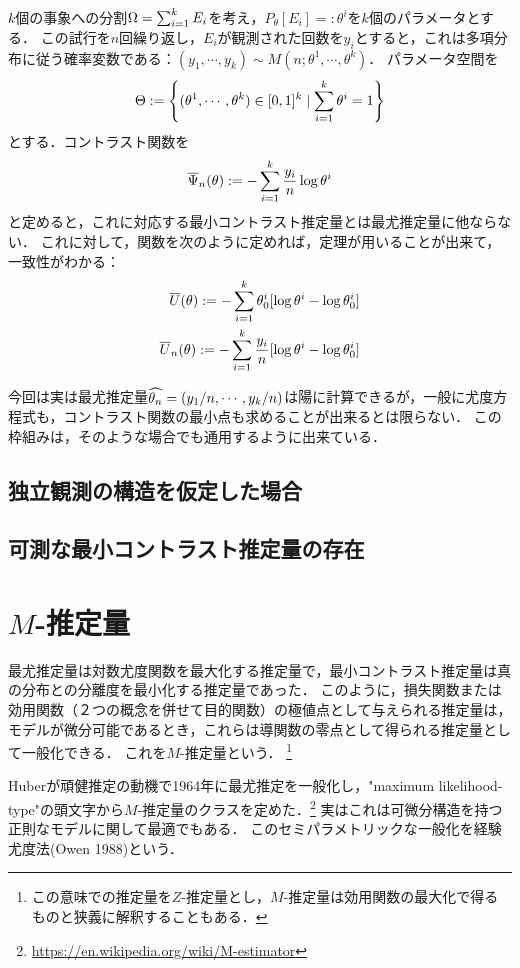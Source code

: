\documentclass[uplatex,dvipdfmx]{jsreport}
\begin{document}
\begin{example}[多項分布]\label{exp-multinomial-model}
    $k$個の事象への分割$\Omega=\sum^k_{i=1}E_i$を考え，$P_\theta[E_i]=:\theta^i$を$k$個のパラメータとする．
    この試行を$n$回繰り返し，$E_i$が観測された回数を$y_i$とすると，これは多項分布に従う確率変数である：$(y_1,\cdots,y_k)\sim M(n;\theta^1,\cdots,\theta^k)$．
    パラメータ空間を
    \[\Theta:=\left\{(\theta^1,\cdots,\theta^k)\in[0,1]^k\mid\sum^k_{i=1}\theta^i=1\right\}\]
    とする．コントラスト関数を
    \[\overline{\Psi}_n(\theta):=-\sum^k_{i=1}\frac{y_i}{n}\log\theta^i\]
    と定めると，これに対応する最小コントラスト推定量とは最尤推定量に他ならない．
    これに対して，関数を次のように定めれば，定理が用いることが出来て，一致性がわかる：
    \begin{align*}
        \overline{U}(\theta):=-\sum^k_{i=1}\theta^i_0[\log\theta^i-\log\theta^i_0]\\
        \overline{U}_n(\theta):=-\sum^k_{i=1}\frac{y_i}{n}[\log\theta^i-\log\theta^i_0]
    \end{align*}

    今回は実は最尤推定量$\widehat{\theta_n}=(y_1/n,\cdots,y_k/n)$は陽に計算できるが，一般に尤度方程式も，コントラスト関数の最小点も求めることが出来るとは限らない．
    この枠組みは，そのような場合でも通用するように出来ている．
\end{example}

\subsection{独立観測の構造を仮定した場合}

\subsection{可測な最小コントラスト推定量の存在}

\section{$M$-推定量}

\begin{tcolorbox}[colframe=ForestGreen, colback=ForestGreen!10!white,breakable,colbacktitle=ForestGreen!40!white,coltitle=black,fonttitle=\bfseries\sffamily,
title=]
    最尤推定量は対数尤度関数を最大化する推定量で，最小コントラスト推定量は真の分布との分離度を最小化する推定量であった．
    このように，損失関数または効用関数（２つの概念を併せて目的関数）の極値点として与えられる推定量は，
    モデルが微分可能であるとき，これらは導関数の零点として得られる推定量として一般化できる．
    これを$M$-推定量という．
    \footnote{この意味での推定量を$Z$-推定量とし，$M$-推定量は効用関数の最大化で得るものと狭義に解釈することもある．}

    Huberが頑健推定の動機で1964年に最尤推定を一般化し，"maximum likelihood-type"の頭文字から$M$-推定量のクラスを定めた．\footnote{\url{https://en.wikipedia.org/wiki/M-estimator}}
    実はこれは可微分構造を持つ正則なモデルに関して最適でもある．
    このセミパラメトリックな一般化を経験尤度法(Owen 1988)という．
\end{tcolorbox}
\end{document}
